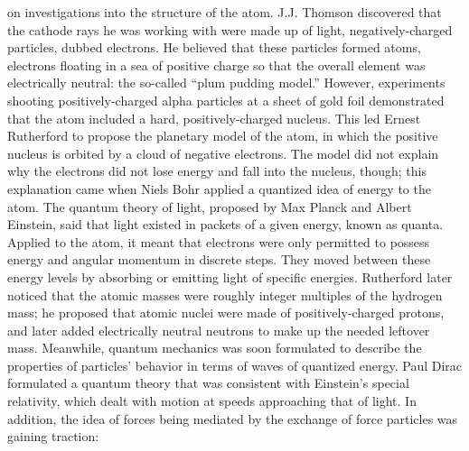 on investigations into the structure of the atom.  
J.J. Thomson discovered that the cathode rays 
he was working with were 
made up of light, negatively-charged particles, 
dubbed electrons.  
He believed that these particles formed atoms, 
electrons floating in a sea of positive charge 
so that the overall element was electrically neutral: %
the so-called ``plum pudding model.''  
However, experiments shooting positively-charged 
alpha particles at a sheet of gold foil demonstrated 
that the atom included a hard, positively-charged nucleus.  
This led Ernest Rutherford to propose the 
planetary model of the atom, in which the positive nucleus 
is orbited by a cloud of negative electrons.  
The model did not explain why the electrons did not 
lose energy and fall into the nucleus, though; 
this explanation came when Niels Bohr applied a 
quantized idea of energy to the atom.  
The quantum theory of light, 
proposed by Max Planck and Albert Einstein, 
said that light existed in packets of a given energy, 
known as quanta. 
Applied to the atom, it meant that 
electrons were only permitted to possess 
energy and angular momentum in discrete steps.  
They moved between these energy levels by absorbing 
or emitting light of specific energies.  
Rutherford later noticed that the atomic masses 
were roughly integer multiples of the hydrogen mass; 
he proposed that atomic nuclei were made of 
positively-charged protons, 
and later added electrically neutral neutrons 
to make up the needed leftover mass.  
Meanwhile, quantum mechanics was soon formulated to describe 
the properties of particles' behavior in terms of waves 
of quantized energy.  
Paul Dirac formulated a quantum theory that was consistent 
with Einstein's special relativity, 
which dealt with motion at speeds approaching that of light.  
In addition, the idea of forces being mediated by the exchange 
of force particles was gaining traction: 
